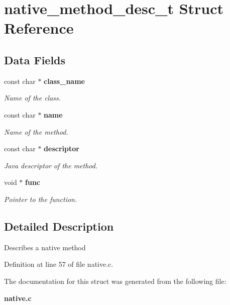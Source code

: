 \section{native\_\-method\_\-desc\_\-t Struct Reference}
\label{structnative__method__desc__t}
\subsection*{Data Fields}
\begin{DoxyCompactItemize}
\item 
const char $\ast$ {\bf class\_\-name}\label{structnative__method__desc__t_ab9db921b240f54356a88c8329efcdf31}

\begin{DoxyCompactList}\small\item\em Name of the class. \item\end{DoxyCompactList}\item 
const char $\ast$ {\bf name}\label{structnative__method__desc__t_a9864b32b1d6d6e058aa5556d34e1e138}

\begin{DoxyCompactList}\small\item\em Name of the method. \item\end{DoxyCompactList}\item 
const char $\ast$ {\bf descriptor}\label{structnative__method__desc__t_a57722e648bec63b6f6631828095eddce}

\begin{DoxyCompactList}\small\item\em Java descriptor of the method. \item\end{DoxyCompactList}\item 
void $\ast$ {\bf func}\label{structnative__method__desc__t_a4db0d8e04aa0c68bc8df2b40ded4da9c}

\begin{DoxyCompactList}\small\item\em Pointer to the function. \item\end{DoxyCompactList}\end{DoxyCompactItemize}


\subsection{Detailed Description}
Describes a native method 

Definition at line 57 of file native.c.



The documentation for this struct was generated from the following file:\begin{DoxyCompactItemize}
\item 
{\bf native.c}\end{DoxyCompactItemize}
